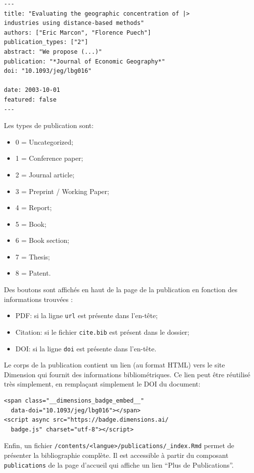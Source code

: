 \documentclass[
  12pt,
  french,
  a4paper,
  extrafontsizes,onecolumn,openright
  ]{memoir}
\providecommand{\tightlist}{%
  \setlength{\itemsep}{0pt}\setlength{\parskip}{0pt}}
\begin{document}
\begin{verbatim}
---
title: "Evaluating the geographic concentration of |>
industries using distance-based methods"
authors: ["Eric Marcon", "Florence Puech"]
publication_types: ["2"]
abstract: "We propose (...)"
publication: "*Journal of Economic Geography*"
doi: "10.1093/jeg/lbg016"

date: 2003-10-01
featured: false
---
\end{verbatim}

Les types de publication sont:

\begin{itemize}
\tightlist
\item
  0 = Uncategorized;
\item
  1 = Conference paper;
\item
  2 = Journal article;
\item
  3 = Preprint / Working Paper;
\item
  4 = Report;
\item
  5 = Book;
\item
  6 = Book section;
\item
  7 = Thesis;
\item
  8 = Patent.
\end{itemize}

Des boutons sont affichés en haut de la page de la publication en fonction des informations trouvées :

\begin{itemize}
\tightlist
\item
  PDF: si la ligne \texttt{url} est présente dans l'en-tête;
\item
  Citation: si le fichier \texttt{cite.bib} est présent dans le dossier;
\item
  DOI: si la ligne \texttt{doi} est présente dans l'en-tête.
\end{itemize}

Le corps de la publication contient un lien (au format HTML) vers le site Dimension qui fournit des informations bibliométriques.
Ce lien peut être réutilisé très simplement, en remplaçant simplement le DOI du document:

\begin{verbatim}
<span class="__dimensions_badge_embed__" 
  data-doi="10.1093/jeg/lbg016"></span>
<script async src="https://badge.dimensions.ai/
  badge.js" charset="utf-8"></script>
\end{verbatim}

Enfin, un fichier \texttt{/contents/\textless{}langue\textgreater{}/publications/}\break\texttt{\_index.Rmd} permet de présenter la bibliographie complète.
Il est accessible à partir du composant \texttt{publications} de la page d'accueil qui affiche un lien \enquote{Plus de Publications}.
\end{document}
